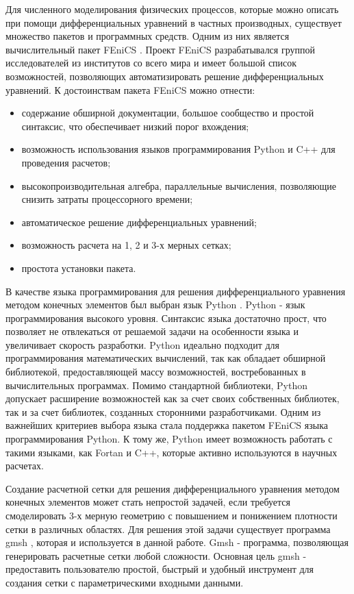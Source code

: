Для численного моделирования физических процессов, которые можно описать при помощи дифференциальных уравнений в 
частных производных, существует множество пакетов и программных средств. Одним из них является вычислительный пакет 
FEniCS \cite{fenics_tut1}. Проект FEniCS разрабатывался группой исследователей из институтов со всего мира и имеет 
большой список возможностей, позволяющих автоматизировать решение дифференциальных уравнений. К достоинствам пакета 
FEniCS можно отнести:

\begin{itemize}
	\item содержание обширной документации, большое сообщество и простой синтаксис, что обеспечивает низкий порог 
		вхождения;
	\item возможность использования языков программирования Python и C++ для проведения расчетов;
	\item высокопроизводительная алгебра, параллельные вычисления, позволяющие снизить затраты процессорного времени; 
	\item автоматическое решение дифференциальных уравнений;
	\item возможность расчета на 1, 2 и 3-х мерных сетках;
	\item простота установки пакета.
\end{itemize} 

В качестве языка программирования для решения дифференциального уравнения методом конечных элементов был выбран язык 
Python \cite{python_lutz}. Python - язык программирования высокого уровня. Синтаксис языка достаточно прост, что 
позволяет не отвлекаться от решаемой задачи на особенности языка и увеличивает скорость разработки. Python идеально 
подходит для программирования математических вычислений, так как обладает обширной библиотекой, предоставляющей массу 
возможностей, востребованных в вычислительных программах. Помимо стандартной библиотеки, Python допускает расширение 
возможностей как за счет своих собственных библиотек, так и за счет библиотек, созданных сторонними разработчиками. 
Одним из важнейших критериев выбора языка стала поддержка пакетом FEniCS языка программирования Python. К тому же, 
Python имеет возможность работать с такими языками, как Fortan и C++, которые активно используются в научных расчетах.

Создание расчетной сетки для решения дифференциального уравнения методом конечных элементов может стать непростой 
задачей, если требуется смоделировать 3-х мерную геометрию с повышением и понижением плотности сетки в различных 
областях. Для решения этой задачи существует программа gmsh \cite{gmsh_man}, которая и используется в данной работе.
Gmsh - программа, позволяющая генерировать расчетные сетки любой сложности. Основная цель gmsh - предоставить 
пользователю простой, быстрый и удобный инструмент для создания сетки с параметрическими входными данными.

